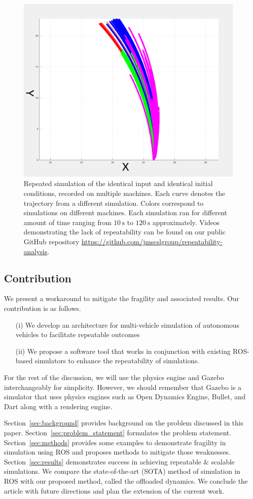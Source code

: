 \documentclass[aps,pra,twocolumn,notitlepage,nofootinbib,superscriptaddress]{revtex4-1}
\begin{document}
\begin{figure}[htpb]
\centering
\includegraphics[angle=0,origin=c,trim={0.0cm 0.0cm 0.0cm 0.0cm},clip,width=0.45\linewidth]{ten-timesslower_2.png}
\caption{Repeated simulation of the identical input and identical initial conditions, recorded on multiple machines. Each curve denotes the trajectory from a different simulation. Colors correspond to simulations on different machines. Each simulation ran for different amount of time ranging from $10~\textrm{s}$ to $120~\textrm{s}$ approximately. Videos demonstrating the lack of repeatability can be found on our public GitHub repository \url{https://github.com/jmscslgroup/repeatability-analysis}.}
\label{fig:ten-timesslower}
\end{figure}



\subsection{Contribution}
We present a workaround to mitigate the fragility and associated results. Our contribution is as follows.
\begin{itemize}
    \item[(i)] We develop an architecture for multi-vehicle simulation of autonomous vehicles to facilitate repeatable outcomes
    \item[(ii)] We propose a software tool that works in conjunction with existing ROS-based simulators to enhance the repeatability of simulations.
\end{itemize}
For the rest of the discussion, we will use the physics engine and Gazebo interchangeably for simplicity. However, we should remember that Gazebo is a simulator that uses physics engines such as Open Dynamics Engine, Bullet, and Dart along with a rendering engine.

Section~\ref{sec:background} provides background on the problem discussed in this paper. Section~\ref{sec:problem_statement} formulates the problem statement. Section~\ref{sec:methods} provides some examples to demonstrate fragility in simulation using ROS and proposes methods to mitigate those weaknesses. Section~\ref{sec:results} demonstrates success in achieving repeatable \& scalable simulations. We compare the state-of-the-art (SOTA) method of simulation in ROS with our proposed method, called the offloaded dynamics.  We conclude the article with future directions and plan the extension of the current work.
\end{document}
